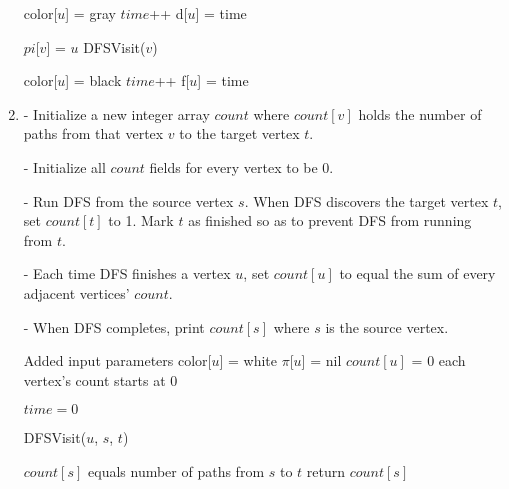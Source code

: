 \documentclass[a4paper]{report}
\begin{document}
\begin{enumerate}
    \begin{algorithmic}
      \State color[$u$] = gray
      \State $time$++
      \State d[$u$] = time

          \State $pi$[$v$] = $u$
          \State DFSVisit($v$)
        \EndIf
      \EndFor

      \State color[$u$] = black
      \State $time$++
      \State f[$u$] = time
    \EndFunction
    \end{algorithmic}

    \par
    \bigskip

    \item
      - Initialize a new integer array $count$ where $count[v]$ holds the number of paths from 
      that vertex $v$ to the target vertex $t$. 

      - Initialize all $count$ fields for every vertex to be 0. 

      - Run DFS from the source vertex $s$. When DFS discovers the target vertex $t$,
      set $count[t]$ to 1. Mark $t$ as finished so as to prevent DFS from running from $t$.

      - Each time DFS finishes a vertex $u$, set $count[u]$ to equal the sum of every adjacent
      vertices' $count$.

      - When DFS completes, print $count[s]$ where $s$ is the source vertex.

      \begin{algorithmic}[1]

      \Comment Added input parameters
        \State color[$u$] = white
        \State $\pi$[$u$] = nil
        \State $count[u]$ = 0 
      \Comment each vertex's count starts at 0

      \EndFor
      \State $time=0$


          \State DFSVisit($u$, $s$, $t$)
        \EndIf
      \EndFor

      \Comment $count[s]$ equals number of paths from $s$ to $t$
      \State return $count[s]$

    \EndFunction
    \end{algorithmic}


\end{enumerate}
\end{document}
